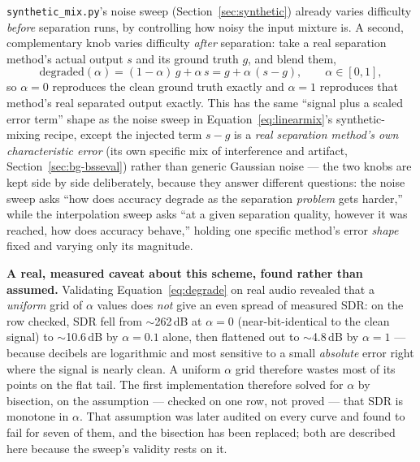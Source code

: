 \documentclass[11pt]{article}
\begin{document}
\texttt{synthetic\_mix.py}'s noise sweep (Section~\ref{sec:synthetic})
already varies difficulty \emph{before} separation runs, by controlling
how noisy the input mixture is. A second, complementary knob varies
difficulty \emph{after} separation: take a real separation method's actual
output $s$ and its ground truth $g$, and blend them,
\begin{equation}
\text{degraded}(\alpha) = (1-\alpha)\,g + \alpha\, s = g + \alpha\,(s-g),
\qquad \alpha\in[0,1],
\label{eq:degrade}
\end{equation}
so $\alpha{=}0$ reproduces the clean ground truth exactly and $\alpha{=}1$
reproduces that method's real separated output exactly. This has the same
``signal plus a scaled error term'' shape as the noise sweep in
Equation~\ref{eq:linearmix}'s synthetic-mixing recipe, except the injected
term $s-g$ is a \emph{real separation method's own characteristic error}
(its own specific mix of interference and artifact, Section~\ref{sec:bg-bsseval})
rather than generic Gaussian noise --- the two knobs are kept side by side
deliberately, because they answer different questions: the noise sweep
asks ``how does accuracy degrade as the separation \emph{problem} gets
harder,'' while the interpolation sweep asks ``at a given separation
quality, however it was reached, how does accuracy behave,'' holding one
specific method's error \emph{shape} fixed and varying only its
magnitude.

\textbf{A real, measured caveat about this scheme, found rather than
assumed.} Validating Equation~\ref{eq:degrade} on real audio revealed that
a \emph{uniform} grid of $\alpha$ values does \emph{not} give an even
spread of measured SDR: on the row checked, SDR fell from
$\sim$262\,dB at $\alpha{=}0$ (near-bit-identical to the clean signal) to
$\sim$10.6\,dB by $\alpha{=}0.1$ alone, then flattened out to
$\sim$4.8\,dB by $\alpha{=}1$ --- because decibels are logarithmic and most
sensitive to a small \emph{absolute} error right where the signal is
nearly clean. A uniform $\alpha$ grid therefore wastes most of its points
on the flat tail. The first implementation therefore solved for $\alpha$
by bisection, on the assumption --- checked on one row, not proved --- that
SDR is monotone in $\alpha$. That assumption was later audited on every
curve and found to fail for seven of them, and the bisection has been
replaced; both are described here because the sweep's validity rests on
it.
\end{document}
